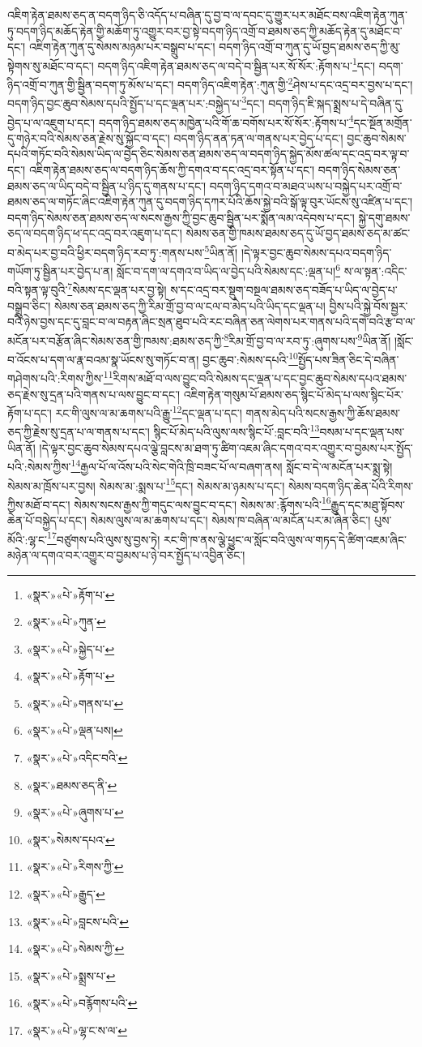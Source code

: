 འཇིག་རྟེན་ཐམས་ཅད་ན་བདག་ཉིད་ཅི་འདོད་པ་བཞིན་དུ་བྱ་བ་ལ་དབང་དུ་གྱུར་པར་མཐོང་བས་འཇིག་རྟེན་ཀུན་ཏུ་བདག་ཉིད་མཆོད་རྟེན་གྱི་མཆོག་ཏུ་འགྱུར་བར་བྱ་སྟེ་བདག་ཉིད་འགྲོ་བ་ཐམས་ཅད་ཀྱི་མཆོད་རྟེན་དུ་མཐོང་བ་དང་། འཇིག་རྟེན་ཀུན་དུ་སེམས་མཉམ་པར་བསྒྲུབ་པ་དང་། བདག་ཉིད་འགྲོ་བ་ཀུན་དུ་ཡོ་བྱད་ཐམས་ཅད་ཀྱི་མུ་སྟེགས་སུ་མཐོང་བ་དང་། བདག་ཉིད་འཇིག་རྟེན་ཐམས་ཅད་ལ་བདེ་བ་སྦྱིན་པར་སོ་སོར་:རྟོགས་པ་\footnote{«སྣར་»«པེ་»རྟོག་པ་}དང་། བདག་ཉིད་འགྲོ་བ་ཀུན་གྱི་སྦྱིན་བདག་ཏུ་མོས་པ་དང་། བདག་ཉིད་འཇིག་རྟེན་:ཀུན་གྱི་\footnote{«སྣར་»«པེ་»ཀུན་}ཤེས་པ་དང་འདྲ་བར་བྱས་པ་དང་། བདག་ཉིད་བྱང་ཆུབ་སེམས་དཔའི་སྤྱོད་པ་དང་ལྡན་པར་:བསྐྱེད་པ་\footnote{«སྣར་»«པེ་»སྐྱེད་པ་}དང་། བདག་ཉིད་ཇི་སྐད་སྨྲས་པ་དེ་བཞིན་དུ་བྱེད་པ་ལ་འཇུག་པ་དང་། བདག་ཉིད་ཐམས་ཅད་མཁྱེན་པའི་གོ་ཆ་བགོས་པར་སོ་སོར་:རྟོགས་པ་\footnote{«སྣར་»«པེ་»རྟོག་པ་}དང་སྔོན་མགྲོན་དུ་གཉེར་བའི་སེམས་ཅན་རྗེས་སུ་སྐྱོང་བ་དང་། བདག་ཉིད་ནན་ཏན་ལ་གནས་པར་བྱེད་པ་དང་། བྱང་ཆུབ་སེམས་དཔའི་གཏོང་བའི་སེམས་ཡིད་ལ་བྱེད་ཅིང་སེམས་ཅན་ཐམས་ཅད་ལ་བདག་ཉིད་སྐྱེད་མོས་ཚལ་དང་འདྲ་བར་ལྟ་བ་དང་། འཇིག་རྟེན་ཐམས་ཅད་ལ་བདག་ཉིད་ཆོས་ཀྱི་དགའ་བ་དང་འདྲ་བར་སྟོན་པ་དང་། བདག་ཉིད་སེམས་ཅན་ཐམས་ཅད་ལ་ཡིད་བདེ་བ་སྦྱིན་པ་ཉིད་དུ་གནས་པ་དང་། བདག་ཉིད་དགའ་བ་མཐའ་ཡས་པ་བསྐྱེད་པར་འགྲོ་བ་ཐམས་ཅད་ལ་གཏོང་ཞིང་འཇིག་རྟེན་ཀུན་དུ་བདག་ཉིད་དཀར་པོའི་ཆོས་སྐྱེ་བའི་སྒོ་ལྟ་བུར་ཡོངས་སུ་འཛིན་པ་དང་། བདག་ཉིད་སེམས་ཅན་ཐམས་ཅད་ལ་སངས་རྒྱས་ཀྱི་བྱང་ཆུབ་སྦྱིན་པར་སྨོན་ལམ་འདེབས་པ་དང་། སྐྱེ་དགུ་ཐམས་ཅད་ལ་བདག་ཉིད་ཕ་དང་འདྲ་བར་འཇུག་པ་དང་། སེམས་ཅན་གྱི་ཁམས་ཐམས་ཅད་དུ་ཡོ་བྱད་ཐམས་ཅད་མ་ཚང་བ་མེད་པར་བྱ་བའི་ཕྱིར་བདག་ཉིད་རབ་ཏུ་:གནས་པས་\footnote{«སྣར་»«པེ་»གནས་པ་}ཡིན་ནོ། །དེ་ལྟར་བྱང་ཆུབ་སེམས་དཔའ་བདག་ཉིད་གཡོག་ཏུ་སྦྱིན་པར་བྱེད་པ་ན། སློང་བ་དག་ལ་དགའ་བ་ཡིད་ལ་བྱེད་པའི་སེམས་དང་:ལྡན་པ།\footnote{«སྣར་»«པེ་»ལྡན་པས།} ས་ལ་སྟན་:འདིང་བའི་སྟན་ལྟ་བུའི་\footnote{«སྣར་»«པེ་»འདིང་བའི་}སེམས་དང་ལྡན་པར་བྱ་སྟེ། ས་དང་འདྲ་བར་སྡུག་བསྔལ་ཐམས་ཅད་བཟོད་པ་ཡིད་ལ་བྱེད་པ་བསྒྲུབ་ཅིང་། སེམས་ཅན་ཐམས་ཅད་ཀྱི་རིམ་གྲོ་བྱ་བ་ལ་ངལ་བ་མེད་པའི་ཡིད་དང་ལྡན་པ། བྱིས་པའི་སྐྱེ་བོས་སྦྱར་བའི་ཉེས་བྱས་དང་དུ་བླང་བ་ལ་བརྟན་ཞིང་སྲན་ཐུབ་པའི་རང་བཞིན་ཅན་ལེགས་པར་གནས་པའི་དགེ་བའི་རྩ་བ་ལ་མངོན་པར་བརྩོན་ཞིང་སེམས་ཅན་གྱི་ཁམས་:ཐམས་ཅད་ཀྱི་\footnote{«སྣར་»ཐམས་ཅད་ནི་}རིམ་གྲོ་བྱ་བ་ལ་རབ་ཏུ་:ཞུགས་པས་\footnote{«སྣར་»«པེ་»ཞུགས་པ་}ཡིན་ནོ། །སློང་བ་འོངས་པ་དག་ལ་རྣ་བའམ་སྣ་ཡོངས་སུ་གཏོང་བ་ན། བྱང་ཆུབ་:སེམས་དཔའི་\footnote{«སྣར་»སེམས་དཔའ་}སྤྱོད་པས་ཟིན་ཅིང་དེ་བཞིན་གཤེགས་པའི་:རིགས་ཀྱིས་\footnote{«སྣར་»«པེ་»རིགས་ཀྱི་}རིགས་མཐོ་བ་ལས་བྱུང་བའི་སེམས་དང་ལྡན་པ་དང་བྱང་ཆུབ་སེམས་དཔའ་ཐམས་ཅད་རྗེས་སུ་དྲན་པའི་གནས་པ་ལས་བྱུང་བ་དང་། འཇིག་རྟེན་གསུམ་པོ་ཐམས་ཅད་སྙིང་པོ་མེད་པ་ལས་སྙིང་པོར་རྟོག་པ་དང་། རང་གི་ལུས་ལ་མ་ཆགས་པའི་རྒྱུ་\footnote{«སྣར་»«པེ་»རྒྱུད་}དང་ལྡན་པ་དང་། གནས་མེད་པའི་སངས་རྒྱས་ཀྱི་ཆོས་ཐམས་ཅད་ཀྱི་རྗེས་སུ་དྲན་པ་ལ་གནས་པ་དང་། སྙིང་པོ་མེད་པའི་ལུས་ལས་སྙིང་པོ་:བླང་བའི་\footnote{«སྣར་»«པེ་»བླངས་པའི་}བསམ་པ་དང་ལྡན་པས་ཡིན་ནོ། །དེ་ལྟར་བྱང་ཆུབ་སེམས་དཔའ་ལྕེ་བླངས་མ་ཐག་ཏུ་ཚིག་འཇམ་ཞིང་དགའ་བར་འགྱུར་བ་བྱམས་པར་སྤྱོད་པའི་:སེམས་ཀྱིས་\footnote{«སྣར་»«པེ་»སེམས་ཀྱི་}རྒྱལ་པོ་ལ་འོས་པའི་སེང་གེའི་ཁྲི་བཟང་པོ་ལ་བཞག་ནས། སློང་བ་དེ་ལ་མངོན་པར་སྨྲ་སྟེ། སེམས་མ་ཁྲོས་པར་བྱས། སེམས་མ་:སྨས་པ་\footnote{«སྣར་»«པེ་»སྨྲས་པ་}དང་། སེམས་མ་ཉམས་པ་དང་། སེམས་བདག་ཉིད་ཆེན་པོའི་རིགས་ཀྱིས་མཐོ་བ་དང་། སེམས་སངས་རྒྱས་ཀྱི་གདུང་ལས་བྱུང་བ་དང་། སེམས་མ་:རྙོགས་པའི་\footnote{«སྣར་»«པེ་»བརྙོགས་པའི་}རྒྱུད་དང་མཐུ་སྟོབས་ཆེན་པོ་བསྐྱེད་པ་དང་། སེམས་ལུས་ལ་མ་ཆགས་པ་དང་། སེམས་ཁ་བཞིན་ལ་མངོན་པར་མ་ཞེན་ཅིང་། པུས་མོའི་:ལྷ་ང་\footnote{«སྣར་»«པེ་»ལྷ་ང་ས་ལ་}བཙུགས་པའི་ལུས་སུ་བྱས་ཏེ། རང་གི་ཁ་ནས་ལྕེ་ཕྱུང་ལ་སློང་བའི་ལུས་ལ་གཏད་དེ་ཚིག་འཇམ་ཞིང་མཉེན་ལ་དགའ་བར་འགྱུར་བ་བྱམས་པ་ཉེ་བར་སྤྱོད་པ་འབྱིན་ཅིང་། 